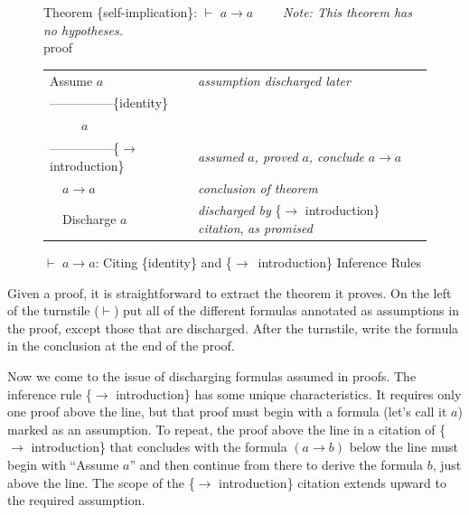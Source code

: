 {\begin{figure}
Theorem \{self-implication\}: $\vdash$ $a \rightarrow a$ ~~~~\emph{Note: This theorem has no hypotheses.}\\
proof
\begin{center}
\begin{tabular}{ll}
Assume $a$                  &\emph{assumption discharged later}\\
---------------\{identity\} &\\
~~~~~$a$                    &\\
---------------\{$\rightarrow$ introduction\} &\emph{assumed} $a$\emph{, proved} $a$\emph{, conclude} $a \rightarrow a$\\
~~$a \rightarrow a$         &\emph{conclusion of theorem}\\
~~Discharge $a$             &\emph{discharged by} \{$\rightarrow$ introduction\} \emph{citation}, \emph{as promised}\\
\end{tabular}
\end{center}
\caption{$\vdash$ $a \rightarrow a$: Citing  \{identity\} and \{$\rightarrow$\ introduction\} Inference Rules}
\label{fig:or-self-imp-proof}
\end{figure}

Given a proof, it is straightforward to extract
the theorem it proves.
On the left of the turnstile ($\vdash$) put all of the different
formulas annotated as assumptions in the proof,
except those that are discharged.
After the turnstile, write the formula in the
conclusion at the end of the proof.

Now we come to the issue of
discharging
formulas assumed in proofs.
The inference rule \{$\rightarrow$ introduction\}
has some unique characteristics.
It requires only one proof above the line,
but that proof must begin with a formula
(let's call it $a$)
marked as an assumption.
To repeat, the proof above the line in a citation of
\{$\rightarrow$ introduction\} that
concludes with the formula $(a \rightarrow b)$
below the line
must begin with ``Assume $a$'' and
then continue from there to derive the formula $b$, just above the line.
The scope of the \{$\rightarrow$ introduction\} citation
extends upward to the required assumption.

}
